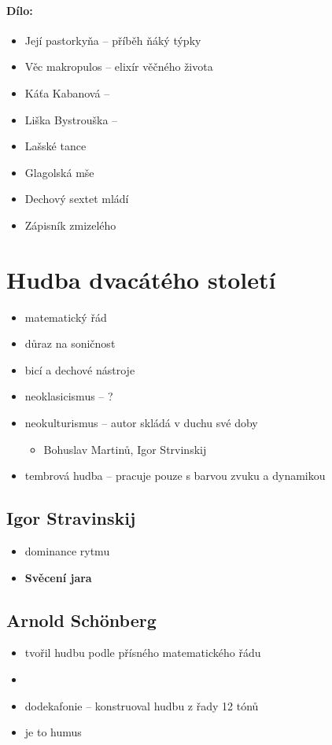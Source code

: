 \paragraph{Dílo:}
\begin{itemize}
\item Její pastorkyňa -- příběh ňáký týpky
\item Věc makropulos -- elixír věčného života
\item Káťa Kabanová -- 
\item Liška Bystrouška --
\item Lašské tance
\item Glagolská mše
\item Dechový sextet mládí
\item Zápisník zmizelého
\end{itemize}

\section{Hudba dvacátého století}
\begin{itemize}
\item matematický řád
\item důraz na soničnost
\item bicí a dechové nástroje
\item neoklasicismus -- ?
\item neokulturismus -- autor skládá v duchu své doby
	\begin{itemize}
	\item Bohuslav Martinů, Igor Strvinskij
	\end{itemize}
\item tembrová hudba -- pracuje pouze s barvou zvuku a dynamikou
\end{itemize}

\subsection{Igor Stravinskij}
\begin{itemize}
\item dominance rytmu
\item \textbf{Svěcení jara}
\end{itemize}

\subsection{Arnold Schönberg}
\begin{itemize}
\item tvořil hudbu podle přísného matematického řádu
\item \item dodekafonie --  konstruoval hudbu z řady 12 tónů 
\item[\ra] je to humus
\end{itemize}

